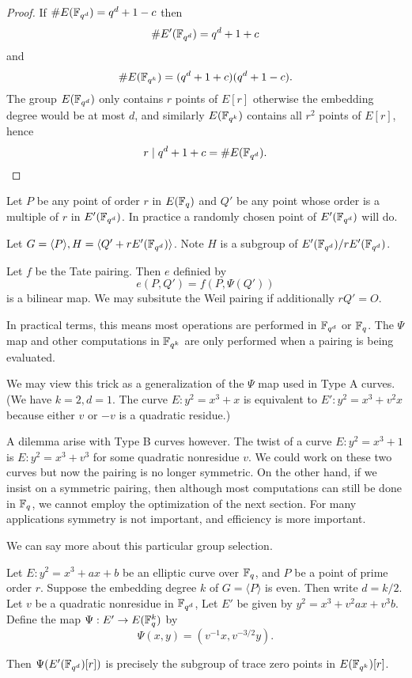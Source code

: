 \begin{proof}
If $\#E(\mathbb{F}_{q^d}) = q^d + 1 - c$ then
\[ \#E'(\mathbb{F}_{q^d}) = q^d + 1 + c \]
and
\[ \#E(\mathbb{F}_{q^k}) = (q^{d} + 1 + c)(q^{d} + 1 - c) . \]
The group $E(\mathbb{F}_{q^d})$ only contains $r$ points of $E[r]$ otherwise
the embedding degree would be at most $d$, and similarly
$E(\mathbb{F}_{q^k})$ contains all $r^2$ points of $E[r]$,
hence
\[ r \mid q^{d} + 1 + c = \#E(\mathbb{F}_{q^d}) .\]
\end{proof}

Let $P$ be any point of order $r$ in $E(\mathbb{F}_q)$ and
$Q'$ be any point whose order is a multiple of $r$ in $E'(\mathbb{F}_{q^d})$.
In practice a randomly chosen point of $E'(\mathbb{F}_{q^d})$ will do.

Let $G = \langle P \rangle, H = \langle Q' + r E'(\mathbb{F}_{q^d}) \rangle$.
Note $H$ is a subgroup of $E'(\mathbb{F}_{q^d}) / rE'(\mathbb{F}_{q^d})$.

Let $f$ be the Tate pairing.
Then $e$ definied by
\[e(P,Q') = f(P, \Psi(Q')) \]
is a bilinear map.
We may subsitute the Weil pairing if additionally
$r Q' = O$.

In practical terms, this means most operations are performed in
$\mathbb{F}_{q^d}$  or $\mathbb{F}_q$. The $\Psi$ map and
other computations in $\mathbb{F}_{q^k}$ are only performed
when a pairing is being evaluated.

We may view this trick as a
generalization of the $\Psi$ map used in Type A curves.
(We have $k =2 , d = 1$.
The curve $E : y^2 = x^3 + x$ is equivalent to $E' : y^2 = x^3 + v^2 x$
because either $v$ or $-v$ is a quadratic residue.)

A dilemma arise with Type B curves however. The twist
of a curve $E : y^2 = x^3 + 1 $ is $E: y^2 = x^3 + v^3 $ for some
quadratic nonresidue $v$. We could work on these two curves but now
the pairing is no longer symmetric. On the other hand, if we insist on
a symmetric pairing, then although most computations can still be done
in $\mathbb{F}_q$, we cannot employ the optimization of the next section. For
many applications symmetry is not important, and efficiency is more important.

We can say more about this particular group selection.

\begin{theorem}
Let $E : y^2 = x^3 + a x + b$ be an elliptic curve over $\mathbb{F}_q$,
and $P$ be a point of prime order $r$.
Suppose the embedding degree $k$ of $G = \langle P \rangle$ is even.
Then write $d = k / 2$. Let $v$ be a quadratic nonresidue in $\mathbb{F}_{q^d}$,
Let $E'$ be given by $y^2 = x^3 + v^2 a x + v^3 b$.
Define the map $\Psi:E'\rightarrow E(\mathbb{F}_q^k)$ by
\[ \Psi(x,y) = (v^{-1}x, v^{-3/2}y) . \]

Then $\Psi(E'(\mathbb{F}_{q^d})[r])$ is precisely the subgroup of trace zero points
in $E(\mathbb{F}_{q^k})[r]$.
\end{theorem}

